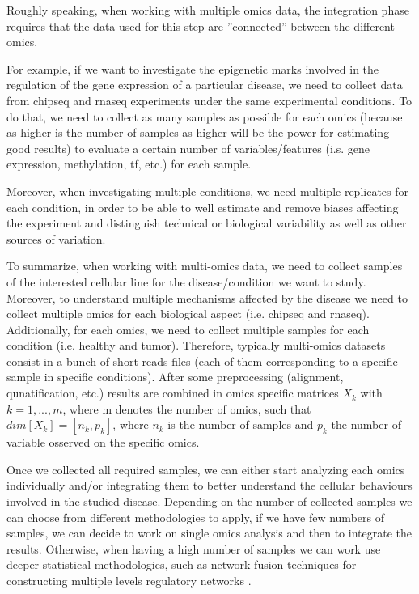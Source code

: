 Roughly speaking, when working with multiple omics data, the integration phase requires that the data used for this step are ''connected'' between the different omics.

For example, if we want to investigate the epigenetic marks involved in the regulation of the gene expression of a particular disease, we need to collect data from \gls{chipseq} and \gls{rnaseq} experiments under the same experimental conditions.
To do that, we need to collect as many samples as possible for each omics (because as higher is the number of samples as higher will be the power for estimating good results) to evaluate a certain number of variables/features (i.s. gene expression, methylation, \gls{tf}, etc.) for each sample.

Moreover, when investigating multiple conditions, we need multiple replicates for each condition, in order to be able to well estimate and remove biases affecting the experiment and distinguish technical or biological variability as well as other sources of variation.

To summarize, when working with multi-omics data, we need to collect samples of the interested cellular line for the disease/condition we want to study.
Moreover, to understand multiple mechanisms affected by the disease we need to collect multiple omics for each biological aspect (i.e. \gls{chipseq} and \gls{rnaseq}).
Additionally, for each omics, we need to collect multiple samples for each condition (i.e. healthy and tumor).
Therefore, typically multi-omics datasets consist in a bunch of short reads files (each of them corresponding to a specific sample in specific conditions). 
After some preprocessing (alignment, qunatification, etc.) results are combined in omics specific matrices $X_k$ with  $k=1,...,m$, where m denotes the number of omics, such that $dim[X_k]=[n_k, p_k]$, where $n_k$ is the number of samples and $p_k$ the number of variable osserved on the specific omics.

Once we collected all required samples, we can either start analyzing each omics individually and/or integrating them to better understand the cellular behaviours involved in the studied disease.
Depending on the number of collected samples we can choose from different methodologies to apply, if we have few numbers of samples, we can decide to work on single omics analysis and then to integrate the results.
Otherwise, when having a high number of samples we can work use deeper statistical methodologies, such as network fusion techniques for constructing multiple levels regulatory networks \cite{Angelini2014c, Rohart2017, Argelaguet2018}.

